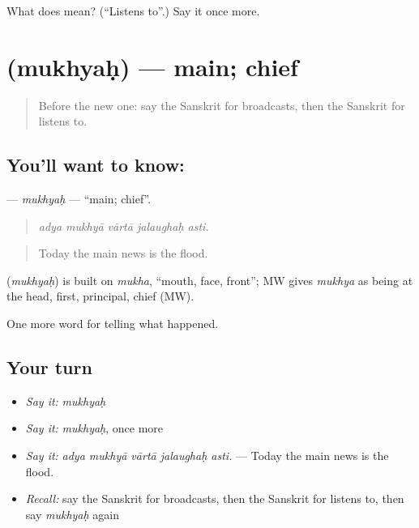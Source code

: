 \begin{tcolorbox}[breakable,colback=teal!4,colframe=teal!35!black,title={Before you move on}]
What does  mean? (\textquotedblleft{}Listens to\textquotedblright{}.) Say it once more.
\end{tcolorbox}
\section[\texorpdfstring{\sk{मुख्यः} (mukhyaḥ)}{मुख्यः (mukhyaḥ)}]{ (mukhyaḥ) — main; chief}

\label{lesson:SA-C309-mukhyah}



\begin{quote}
Before the new one: say the Sanskrit for broadcasts, then the Sanskrit for listens to.
\end{quote}

\subsection*{You'll want to know: }
\textbf{} — \emph{mukhyaḥ} — \textquotedblleft{}main; chief\textquotedblright{}.

\begin{quote}
    
\end{quote}

\begin{quote}
\emph{adya mukhyā vārtā jalaughaḥ asti.}
\end{quote}

\begin{quote}
Today the main news is the flood.
\end{quote}

\begin{cousinweb}
\textbf{} (\emph{mukhyaḥ}) is built on \emph{mukha}, \textquotedblleft{}mouth, face, front\textquotedblright{}; MW gives \emph{mukhya} as being at the head, first, principal, chief (MW).
\end{cousinweb}

\begin{grammarlens}[title={What you've built}]
One more word for telling what happened.
\end{grammarlens}

\subsection*{Your turn}
\begin{itemize}
\raggedright
  \item \emph{Say it:} \emph{mukhyaḥ}
  \item \emph{Say it:} \emph{mukhyaḥ}, once more
  \item \emph{Say it:} \emph{adya mukhyā vārtā jalaughaḥ asti.} — Today the main news is the flood.
  \item \emph{Recall:} say the Sanskrit for broadcasts, then the Sanskrit for listens to, then say \emph{mukhyaḥ} again
\end{itemize}

